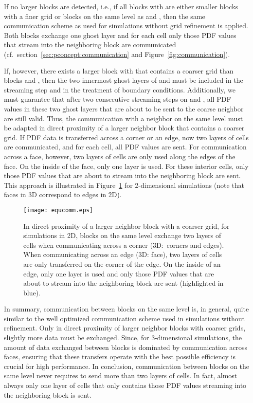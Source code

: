 \documentclass[final,leqno,onefignum,onetabnum]{siamltex1213}
\begin{document}
If no larger blocks are detected,
i.e., if all blocks  with  are either smaller blocks with a finer grid or blocks on the same level as  and ,
then the same communication scheme as used for simulations without grid refinement is applied.
Both blocks exchange one ghost layer and for each cell only those PDF values that stream into the neighboring block are communicated (cf.\ section~\ref{sec:pconcept:communication} and Figure~\ref{fig:communication}).

If, however, there exists a larger block  with  that contains a coarser grid than blocks  and ,
then the two innermost ghost layers of  and  must be included in the streaming step and in the treatment of boundary conditions.
Additionally, we must guarantee that after two consecutive streaming steps on  and , all PDF values in these two ghost layers that are about to be sent to the coarse neighbor are still valid.
Thus, the communication with a neighbor on the same level must be adapted in direct proximity of a larger neighbor block  that contains a coarser grid.
If PDF data is transferred across a corner or an edge, now two layers of cells are communicated, and for each cell, all PDF values are sent.
For communication across a face, however, two layers of cells are only used along the edges of the face. On the inside of the face, only one layer is used.
For these interior cells, only those PDF values that are about to stream into the neighboring block are sent.
This approach is illustrated in Figure~\ref{fig:equal_level_communication} for 2-dimensional simulations (note that faces in 3D correspond to edges in 2D).

\begin{figure}[tbp]
  \centering
  \texttt{[image: equcomm.eps]}
  \caption{In direct proximity of a larger neighbor block with a coarser grid, for simulations in 2D, blocks on the same level exchange two layers of cells when communicating across a corner (3D:~corners and edges).
When communicating across an edge (3D: face), two layers of cells are only transferred on the corner of the edge.
On the inside of an edge, only one layer is used and only those PDF values that are about to stream into the neighboring block are sent (highlighted in blue).}
  \label{fig:equal_level_communication}
\end{figure}

In summary, communication between blocks on the same level is, in general, quite similar to the well optimized communication scheme used in simulations without refinement.
Only in direct proximity of larger neighbor blocks with coarser grids, slightly more data must be exchanged.
Since, for 3-dimensional simulations, the amount of data exchanged between blocks is dominated by communication across faces,
ensuring that these transfers operate with the best possible efficiency is crucial for high performance.
In conclusion, communication between blocks on the same level never requires to send more than two layers of cells.
In fact, almost always only one layer of cells that only contains those PDF values streaming into the neighboring block is sent.
\end{document}
